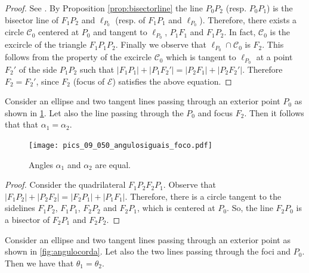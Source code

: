\begin{proof} See \cite[page 10]{akopyan2007-conics}. By Proposition \ref{prop:bisectorline} the line  $P_0P_2$ (resp. $P_0P_1$) is  the bisector line of $F_1P_2$ and $\ell_{P_0}$ (resp. of $F_1P_1$ and $\ell_{P_0}$). Therefore, there exists a circle $\mathcal{C}_0$ centered at $P_0$ and tangent to $\ell_{P_0}$, $P_1F_1$ and $F_1P_2.$ In fact, $\mathcal{C}_0$ is the excircle of the triangle $F_1P_1P_2$.
Finally we observe that $\ell_{P_0}\cap \mathcal{C}_0$ is $F_2.$ This follows from the property of the excircle $\mathcal{C}_0$ which is tangent to $\ell_{P_0}$ at a point $F_2'$ of the side $P_1P_2$ such that
$ |F_1P_1|+|P_1F_2'|=|P_2F_1| +|P_2F_2'|$. Therefore $F_2=F_2'$, since $F_2$ (focus of $\mathcal{E}$) satisfies the above equation.
\end{proof}
\begin{proposition} Consider an ellipse and two tangent lines passing through an exterior point $P_0$ as shown in   \cref{fig:angulofoco}. Let also the  line passing through the $P_0$ and   focus $F_2$.  Then it follows that that $\alpha_1=\alpha_2$. 
\end{proposition} 

\begin{figure} 
	\begin{center}
  \texttt{[image: pics\_09\_050\_angulosiguais\_foco.pdf]}
		\caption {Angles $\alpha_1$ and $\alpha_2$ are equal. 	\label{fig:angulofoco} }
	\end{center}

\end{figure}

\begin{proof} Consider the quadrilateral $F_1P_2F_2P_1.$
Observe that $|F_1P_2|+|P_2F_2|=|F_2P_1|+|P_1F_1|. $
Therefore, there is a circle tangent to the sidelines $F_1P_2$, $F_1P_1$, $F_2P_2$ and $F_2P_1$, which is centered at $P_0.$ So, the line $F_2P_0$ is a bisector of $F_2P_1$ and $F_2P_2.$
\end{proof}



\begin{proposition} Consider an ellipse and two tangent lines passing through an exterior point as shown in    \cref{fig:angulocorda}. Let also the two lines passing through the foci and $P_0$.  Then  we have that $\theta_1=\theta_2$. 
\end{proposition} 

